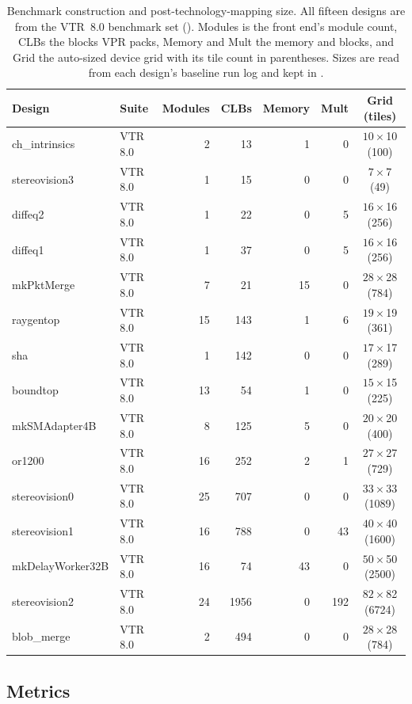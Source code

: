 \begin{table}[t]
\caption{Benchmark construction and post-technology-mapping size. All fifteen
designs are from the VTR~8.0 benchmark set
(). Modules is the front end's module
count, CLBs the  blocks VPR packs, Memory and Mult the memory and
 blocks, and Grid the auto-sized device grid with its tile
count in parentheses. Sizes are read from each design's baseline run log and
kept in .}
\label{tab:benchmarks}
\centering
\footnotesize
\begin{tabular}{@{}l l r r r r c@{}}
\toprule
Design & Suite & Modules & CLBs & Memory & Mult & Grid (tiles) \\
\midrule
ch\_intrinsics & VTR 8.0 & 2 & 13 & 1 & 0 & $10\times$10 (100) \\
stereovision3 & VTR 8.0 & 1 & 15 & 0 & 0 & $7\times$7 (49) \\
diffeq2 & VTR 8.0 & 1 & 22 & 0 & 5 & $16\times$16 (256) \\
diffeq1 & VTR 8.0 & 1 & 37 & 0 & 5 & $16\times$16 (256) \\
mkPktMerge & VTR 8.0 & 7 & 21 & 15 & 0 & $28\times$28 (784) \\
raygentop & VTR 8.0 & 15 & 143 & 1 & 6 & $19\times$19 (361) \\
sha & VTR 8.0 & 1 & 142 & 0 & 0 & $17\times$17 (289) \\
boundtop & VTR 8.0 & 13 & 54 & 1 & 0 & $15\times$15 (225) \\
mkSMAdapter4B & VTR 8.0 & 8 & 125 & 5 & 0 & $20\times$20 (400) \\
or1200 & VTR 8.0 & 16 & 252 & 2 & 1 & $27\times$27 (729) \\
stereovision0 & VTR 8.0 & 25 & 707 & 0 & 0 & $33\times$33 (1089) \\
stereovision1 & VTR 8.0 & 16 & 788 & 0 & 43 & $40\times$40 (1600) \\
mkDelayWorker32B & VTR 8.0 & 16 & 74 & 43 & 0 & $50\times$50 (2500) \\
stereovision2 & VTR 8.0 & 24 & 1956 & 0 & 192 & $82\times$82 (6724) \\
blob\_merge & VTR 8.0 & 2 & 494 & 0 & 0 & $28\times$28 (784) \\
\bottomrule
\end{tabular}
\end{table}


\subsection{Metrics}
\label{sec:metrics}

